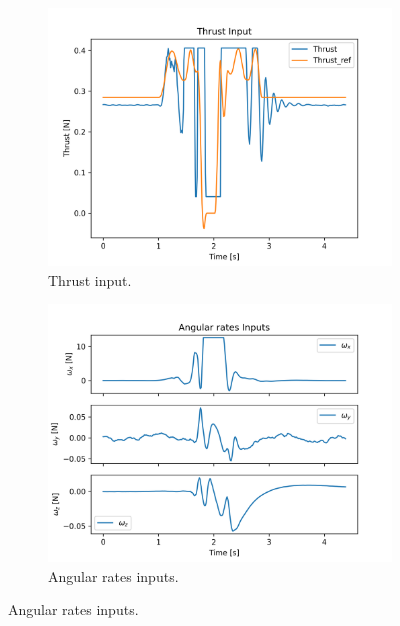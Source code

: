 \documentclass{thesisreport}
\begin{document}
\begin{figure}[H]
\medskip
	\begin{subfigure}{0.43\textwidth}
		\includegraphics[width=\linewidth]{Images/sil_simulations/thrustInput.png}
		\caption{Thrust input.} \label{fig:SIL_3D_flip_thrust_input}
	\end{subfigure}\hspace*{\fill}
	\begin{subfigure}{0.43\textwidth}
		\includegraphics[width=\linewidth]{Images/sil_simulations/angulareRatesInputs.png}
		\caption{Angular rates inputs.} \label{fig:SIL_3D_flip_rates_input}
	\end{subfigure}
	

\end{figure}
\end{document}
